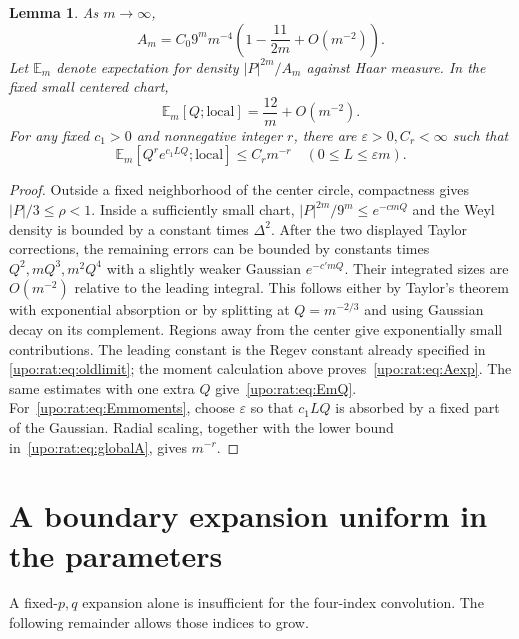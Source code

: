 \documentclass[11pt,letterpaper]{article}
\newtheorem{lemma}[theorem]{Lemma}
\theoremstyle{remark}\newtheorem{remark}[theorem]{Remark}
\numberwithin{equation}{section}
\newcommand{\E}{\mathbb E}
\begin{document}
\begin{lemma}\label{upo:rat:lem:avoidance}
As $m\to\infty$,
\begin{equation}\label{upo:rat:eq:Aexp}
A_m=C_0 9^m m^{-4}\left(1-\frac{11}{2m}+O(m^{-2})\right).
\end{equation}
Let $\E_m$ denote expectation for density $|P|^{2m}/A_m$ against Haar
measure. In the fixed small centered chart,
\begin{equation}\label{upo:rat:eq:EmQ}
\E_m[Q;\mathrm{local}]=\frac{12}{m}+O(m^{-2}).
\end{equation}
For any fixed $c_1>0$ and nonnegative integer $r$, there are
$\varepsilon>0,C_r<\infty$ such that
\begin{equation}\label{upo:rat:eq:Emmoments}
\E_m[Q^r e^{c_1LQ};\mathrm{local}]\le C_rm^{-r}
\quad(0\le L\le\varepsilon m).
\end{equation}
\end{lemma}
\begin{proof}
Outside a fixed neighborhood of the center circle, compactness gives
$|P|/3\le\rho<1$. Inside a sufficiently small chart,
$|P|^{2m}/9^m\le e^{-cmQ}$ and the Weyl density is bounded by a constant
times $\Delta^2$. After the two displayed Taylor corrections, the
remaining errors can be bounded by constants times $Q^2,mQ^3,m^2Q^4$
with a slightly weaker Gaussian $e^{-c'mQ}$. Their integrated sizes are
$O(m^{-2})$ relative to the leading integral. This follows either by
Taylor's theorem with exponential absorption or by splitting at
$Q=m^{-2/3}$ and using Gaussian decay on its complement. Regions away
from the center give exponentially small contributions.
The leading constant is the Regev constant already specified in
\eqref{upo:rat:eq:oldlimit}; the moment calculation above proves~\eqref{upo:rat:eq:Aexp}.
The same estimates with one extra $Q$ give~\eqref{upo:rat:eq:EmQ}.
For~\eqref{upo:rat:eq:Emmoments}, choose $\varepsilon$ so that
$c_1LQ$ is absorbed by a fixed part of the Gaussian. Radial scaling,
together with the lower bound in~\eqref{upo:rat:eq:globalA}, gives $m^{-r}$.
\end{proof}

\section{A boundary expansion uniform in the parameters}\label{upo:rat:sec:boundary}
A fixed-$p,q$ expansion alone is insufficient for the four-index
convolution. The following remainder allows those indices to grow.
\end{document}
